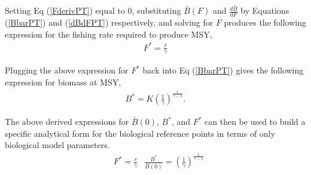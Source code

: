 \documentclass[12pt]{article}
\begin{document}
Setting Eq (\ref{FderivPT}) equal to 0, substituting $\bar B(F)$ and 
$\frac{d \bar B}{dF}$ by Equations (\ref{BbarPT}) and (\ref{dBdFPT}) respectively, 
and solving for $F$ produces the following expression for the fishing 
rate required to produce MSY, %
%
\begin{align}
F^* = \frac{r}{\gamma}%
\end{align}

%
Plugging the above expression for $F^*$ back into Eq (\ref{BbarPT}) gives the 
following expression for biomass at MSY, 
\begin{align}
B^* = K\left(\frac{1}{\gamma}\right)^{\frac{1}{\gamma-1}} \label{BmsyPT}. %
\end{align}

%
The above derived expressions for $\bar B(0)$, $B^*$, and $F^*$ can then be used to 
build a specific analytical form for the biological reference points in terms of only 
biological model parameters.
\begin{align}\label{ptRP}
&F^* = \frac{r}{\gamma}
&\frac{B^*}{\bar B(0)} = \left(\frac{1}{\gamma}\right)^{\frac{1}{\gamma-1}}
\end{align}
\end{document}
